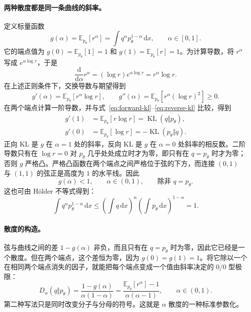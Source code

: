 \documentclass[UTF8,fontset=none,11pt,a4paper]{ctexart}
\newcommand{\E}{\mathbb E}
\newcommand{\KL}{\operatorname{KL}}
\newcommand{\dd}{\,\mathrm d}
\begin{document}
\paragraph{两种散度都是同一条曲线的斜率。}
定义标量函数
\begin{equation}
g(\alpha)
=\E_{p_\theta}[r^\alpha]
=\int q^\alpha p_\theta^{1-\alpha}\dd x,
\qquad \alpha\in[0,1].
\label{eq:g}
\end{equation}
它的端点值为 $g(0)=\E_{p_\theta}[1]=1$ 和 $g(1)=\E_{p_\theta}[r]=1$。为计算导数，将 $r^\alpha$ 写成 $e^{\alpha\log r}$，于是
\[
\frac{\mathrm d}{\mathrm d\alpha}r^\alpha
=(\log r)e^{\alpha\log r}
=r^\alpha\log r.
\]
在上述正则条件下，交换导数与期望得到
\begin{equation}
g'(\alpha)=\E_{p_\theta}[r^\alpha\log r],
\qquad
g''(\alpha)=\E_{p_\theta}[r^\alpha(\log r)^2]\geq0.
\label{eq:g-derivatives}
\end{equation}
在两个端点计算一阶导数，并与式~\eqref{eq:forward-kl}--\eqref{eq:reverse-kl} 比较，得到
\begin{equation}
\begin{aligned}
g'(1)&=\E_{p_\theta}[r\log r]=\KL(q\Vert p_\theta),\\
g'(0)&=\E_{p_\theta}[\log r]=-\KL(p_\theta\Vert q).
\end{aligned}
\label{eq:endpoint-slopes}
\end{equation}
正向 KL 是 $g$ 在 $\alpha=1$ 处的斜率，反向 KL 是 $g$ 在 $\alpha=0$ 处斜率的相反数。二阶导数只有在 $\log r=0$ 对 $p_\theta$ 几乎处处成立时才为零，即只有在 $q=p_\theta$ 时才为零；否则 $g$ 严格凸。严格凸函数在两个端点之间严格位于弦的下方，而连接 $(0,1)$ 与 $(1,1)$ 的弦正是高度为 $1$ 的水平线。因此
\begin{equation}
g(\alpha)<1,
\qquad \alpha\in(0,1),
\qquad\text{除非 }q=p_\theta.
\label{eq:g-bound}
\end{equation}
这也可由 H\"older 不等式得到：
\[
\int q^\alpha p_\theta^{1-\alpha}\dd x
\leq
\left(\int q\dd x\right)^\alpha
\left(\int p_\theta\dd x\right)^{1-\alpha}
=1.
\]

\paragraph{散度的构造。}
弦与曲线之间的差 $1-g(\alpha)$ 非负，而且只有在 $q=p_\theta$ 时为零，因此它已经是一个散度。但在两个端点，这个差恒为零，因为 $g(0)=g(1)=1$。将它除以一个在相同两个端点消失的因子，就能把每个端点变成一个值由斜率决定的 $0/0$ 型极限：
\begin{equation}
D_\alpha(q\Vert p_\theta)
=\frac{1-g(\alpha)}{\alpha(1-\alpha)}
=\frac{\E_{p_\theta}[r^\alpha]-1}{\alpha(\alpha-1)},
\qquad \alpha\in(0,1).
\label{eq:alpha-divergence}
\end{equation}
第二种写法只是同时改变分子与分母的符号。这就是 $\alpha$ 散度的一种标准参数化\cite{cichocki2010,nielsen2022}。
\end{document}
